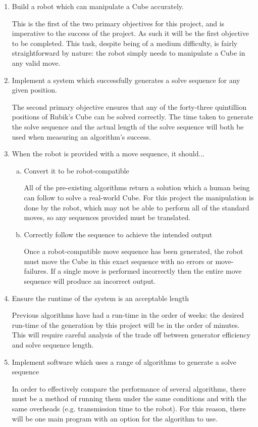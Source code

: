 \documentclass{report}
\begin{document}
    \begin{enumerate}
    	\item Build a robot which can manipulate a Cube accurately. \par This is the first of the two primary objectives for this project, and is imperative to the success of the project. As such it will be the first objective to be completed. This task, despite being of a medium difficulty, is fairly straightforward by nature: the robot simply needs to manipulate a Cube in any valid move.
    	\item Implement a system which successfully generates a solve sequence for any given position. \par The second primary objective ensures that any of the forty-three quintillion positions of Rubik's Cube can be solved correctly. The time taken to generate the solve sequence and the actual length of the solve sequence will both be used when measuring an algorithm's success.
    	\item When the robot is provided with a move sequence, it should...
    	\begin{enumerate}[a)]
    		\item Convert it to be robot-compatible \par All of the pre-existing algorithms return a solution which a human being can follow to solve a real-world Cube. For this project the manipulation is done by the robot, which may not be able to perform all of the standard moves, so any sequences provided must be translated.
    		\item Correctly follow the sequence to achieve the intended output \par Once a robot-compatible move sequence has been generated, the robot must move the Cube in this exact sequence with no errors or move-failures. If a single move is performed incorrectly then the entire move sequence will produce an incorrect output.
    	\end{enumerate}
    	\item Ensure the runtime of the system is an acceptable length \par Previous algorithms have had a run-time in the order of weeks: the desired run-time of the generation by this project will be in the order of minutes. This will require careful analysis of the trade off between generator efficiency and solve sequence length.
    	\item Implement software which uses a range of algorithms to generate a solve sequence \par In order to effectively compare the performance of several algorithms, there must be a method of running them under the same conditions and with the same overheads (e.g. transmission time to the robot). For this reason, there will be one main program with an option for the algorithm to use.

\end{enumerate}
\end{document}
